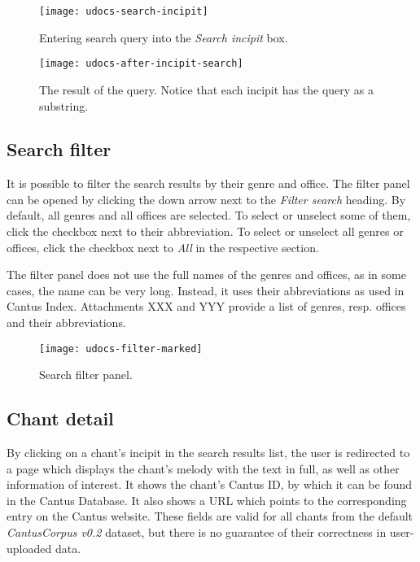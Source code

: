 \begin{figure}[h]
\centering
\texttt{[image: udocs-search-incipit]}
\caption{Entering search query into the \emph{Search incipit} box.}
\label{fig:inc-search}
\end{figure}

\begin{figure}[h]
\centering
\texttt{[image: udocs-after-incipit-search]}
\caption{The result of the query. Notice that each incipit has the query as a substring.}
\label{fig:inc-search-result}
\end{figure}

\subsection{Search filter}

It is possible to filter the search results by their genre and office. The filter panel can be opened by clicking the down arrow next to the \emph{Filter search}
heading. By default, all genres and all offices are selected. To select or unselect some of them, click the checkbox next to their abbreviation. To select 
or unselect all genres or offices, click the checkbox next to \emph{All} in the respective section.

The filter panel does not use the full names of the genres and offices, as in some cases, the name can be very long. Instead, it uses their abbreviations as used 
in Cantus Index. Attachments XXX and YYY provide a list of genres, resp. offices and their abbreviations.

\begin{figure}[h]
\centering
\texttt{[image: udocs-filter-marked]}
\caption{Search filter panel.}
\label{fig:search_filter}
\end{figure}

\subsection{Chant detail}

By clicking on a chant's incipit in the search results list, the user is redirected to a page which displays the chant's melody with the text in full,
as well as other information of interest. It shows the chant's Cantus ID, by which it can be found in the Cantus Database. It also shows a URL which
points to the corresponding entry on the Cantus website. These fields are valid for all chants from the default \emph{CantusCorpus v0.2} dataset,
but there is no guarantee of their correctness in user-uploaded data.

